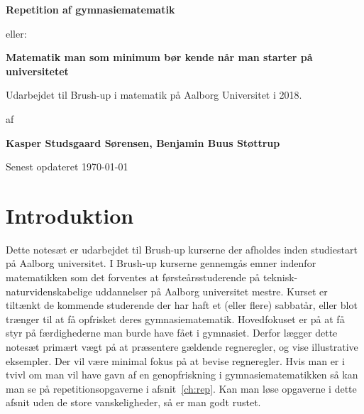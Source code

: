 



\author{Kasper Studsgaard Sørensen, Benjamin Buus Støttrup}

\pagestyle{plain}
\begin{titlepage}
    \begin{center}
        \vspace*{1cm}
        \Huge
        \textbf{Repetition af gymnasiematematik}
 
        \vspace{0.5cm}
        \Large
         eller:
         \vspace{0.5cm}

        
        \Huge
        \textbf{Matematik man som minimum bør kende når man starter på universitetet}
        
        \vspace{0.5cm}
        \large
        Udarbejdet til Brush-up i matematik på Aalborg Universitet i 2018.
        \vspace{1.5cm}

        af 

        \vspace{1.5cm}
        \textbf{Kasper Studsgaard Sørensen, Benjamin Buus Støttrup}

        \vfill
        Senest opdateret \today
        \vspace{2cm}
 
      
        
        
    \end{center}
    \doclicenseThis
 \end{titlepage}



\tableofcontents
\chapter*{Introduktion}\normalsize
Dette notesæt er udarbejdet til Brush-up kurserne der afholdes inden studiestart på Aalborg universitet. I Brush-up kurserne gennemgås emner indenfor matematikken som det forventes at førsteårsstuderende på teknisk-naturvidenskabelige uddannelser på Aalborg universitet mestre. Kurset er tiltænkt de kommende studerende der har haft et (eller flere) sabbatår, eller blot trænger til at få opfrisket deres gymnasiematematik. Hovedfokuset er på at få styr på færdighederne man burde have fået i gymnasiet. Derfor lægger dette notesæt primært vægt på at præsentere gældende regneregler, og vise illustrative eksempler. Der vil være minimal fokus på at bevise regneregler. Hvis man er i tvivl om man vil have gavn af en genopfriskning i gymnasiematematikken så kan man se på repetitionsopgaverne i afsnit~\ref{ch:rep}. Kan man løse opgaverne i dette afsnit uden de store vanskeligheder, så er man godt rustet.

